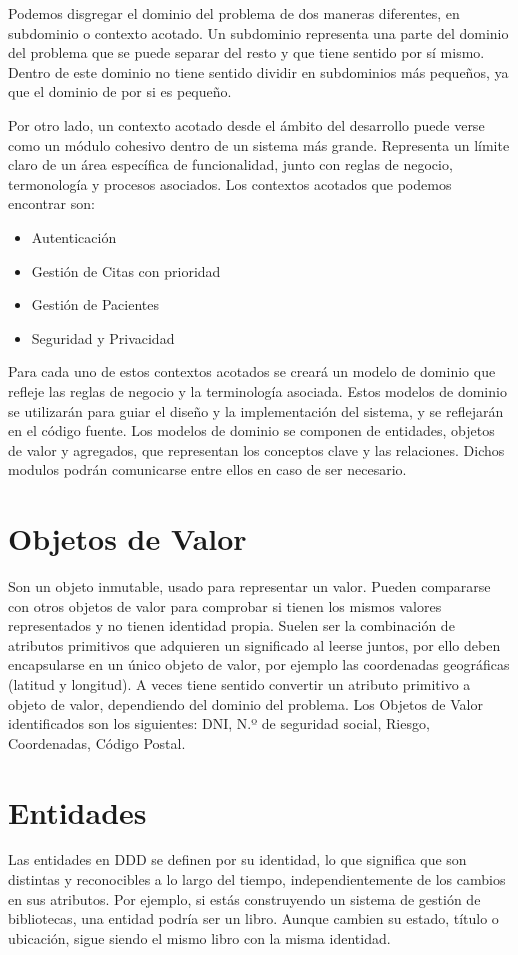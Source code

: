 Podemos disgregar el dominio del problema de dos maneras diferentes, en subdominio o contexto acotado.
Un subdominio representa una parte del dominio del problema que se puede separar del resto y que tiene sentido por sí mismo.
Dentro de este dominio no tiene sentido dividir en subdominios más pequeños, ya que el dominio de por si es pequeño.

Por otro lado, un contexto acotado desde el ámbito del desarrollo puede verse como un módulo cohesivo dentro de un sistema más grande.
Representa un límite claro de un área específica de funcionalidad, junto con reglas de negocio, termonología y procesos asociados.
Los contextos acotados que podemos encontrar son:
\begin{itemize}
    \item Autenticación
    \item Gestión de Citas con prioridad
    \item Gestión de Pacientes
    \item Seguridad y Privacidad
\end{itemize}

Para cada uno de estos contextos acotados se creará un modelo de dominio que refleje las reglas de negocio y la terminología asociada.
Estos modelos de dominio se utilizarán para guiar el diseño y la implementación del sistema, y se reflejarán en el código fuente.
Los modelos de dominio se componen de entidades, objetos de valor y agregados, que representan los conceptos clave y las relaciones.
Dichos modulos podrán comunicarse entre ellos en caso de ser necesario.

\section*{Objetos de Valor}

Son un objeto inmutable, usado para representar un valor. Pueden compararse con otros objetos de valor para comprobar
si tienen los mismos valores representados y no tienen identidad propia.
Suelen ser la combinación de atributos primitivos que adquieren un significado al leerse juntos, por ello deben encapsularse
en un único objeto de valor, por ejemplo las coordenadas geográficas (latitud y longitud). A veces tiene sentido convertir
un atributo primitivo a objeto de valor, dependiendo del dominio del problema.
Los Objetos de Valor identificados son los siguientes: DNI, N.º de seguridad social, Riesgo, Coordenadas, Código Postal.


\section*{Entidades}
Las entidades en DDD se definen por su identidad, lo que significa que son distintas y reconocibles a lo largo del tiempo,
independientemente de los cambios en sus atributos. Por ejemplo, si estás construyendo un sistema de gestión de bibliotecas,
una entidad podría ser un libro. Aunque cambien su estado, título o ubicación, sigue siendo el mismo libro con la misma identidad.

